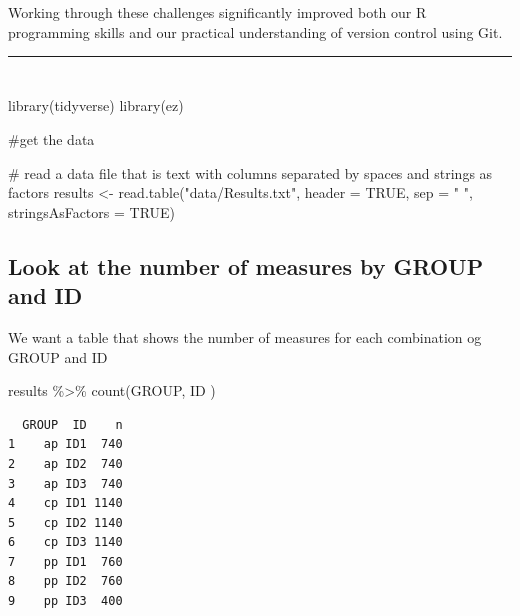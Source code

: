 \documentclass[
  letterpaper,
  DIV=11,
  numbers=noendperiod]{scrartcl}
\newenvironment{Shaded}{\begin{snugshade}}{\end{snugshade}}
\newcommand{\AttributeTok}[1]{\textcolor[rgb]{0.40,0.45,0.13}{#1}}
\newcommand{\CommentTok}[1]{\textcolor[rgb]{0.37,0.37,0.37}{#1}}
\newcommand{\ConstantTok}[1]{\textcolor[rgb]{0.56,0.35,0.01}{#1}}
\newcommand{\FunctionTok}[1]{\textcolor[rgb]{0.28,0.35,0.67}{#1}}
\newcommand{\NormalTok}[1]{\textcolor[rgb]{0.00,0.23,0.31}{#1}}
\newcommand{\OtherTok}[1]{\textcolor[rgb]{0.00,0.23,0.31}{#1}}
\newcommand{\SpecialCharTok}[1]{\textcolor[rgb]{0.37,0.37,0.37}{#1}}
\newcommand{\StringTok}[1]{\textcolor[rgb]{0.13,0.47,0.30}{#1}}
\begin{document}
Working through these challenges significantly improved both our R
programming skills and our practical understanding of version control
using Git.

\begin{center}\rule{0.5\linewidth}{0.5pt}\end{center}

\section{}\label{section}

\begin{Shaded}
\begin{Highlighting}[]
\FunctionTok{library}\NormalTok{(tidyverse)}
\FunctionTok{library}\NormalTok{(ez)}
\end{Highlighting}
\end{Shaded}

\#get the data

\begin{Shaded}
\begin{Highlighting}[]
\CommentTok{\# read a data file that is text with columns separated by spaces and strings as factors}
\NormalTok{results }\OtherTok{\textless{}{-}} \FunctionTok{read.table}\NormalTok{(}\StringTok{"data/Results.txt"}\NormalTok{, }\AttributeTok{header =} \ConstantTok{TRUE}\NormalTok{, }\AttributeTok{sep =} \StringTok{" "}\NormalTok{, }\AttributeTok{stringsAsFactors =} \ConstantTok{TRUE}\NormalTok{)}
\end{Highlighting}
\end{Shaded}

\subsection{Look at the number of measures by GROUP and
ID}\label{look-at-the-number-of-measures-by-group-and-id}

We want a table that shows the number of measures for each combination
og GROUP and ID

\begin{Shaded}
\begin{Highlighting}[]
\NormalTok{results }\SpecialCharTok{\%\textgreater{}\%}
  \FunctionTok{count}\NormalTok{(GROUP, ID )}
\end{Highlighting}
\end{Shaded}

\begin{verbatim}
  GROUP  ID    n
1    ap ID1  740
2    ap ID2  740
3    ap ID3  740
4    cp ID1 1140
5    cp ID2 1140
6    cp ID3 1140
7    pp ID1  760
8    pp ID2  760
9    pp ID3  400
\end{verbatim}
\end{document}
